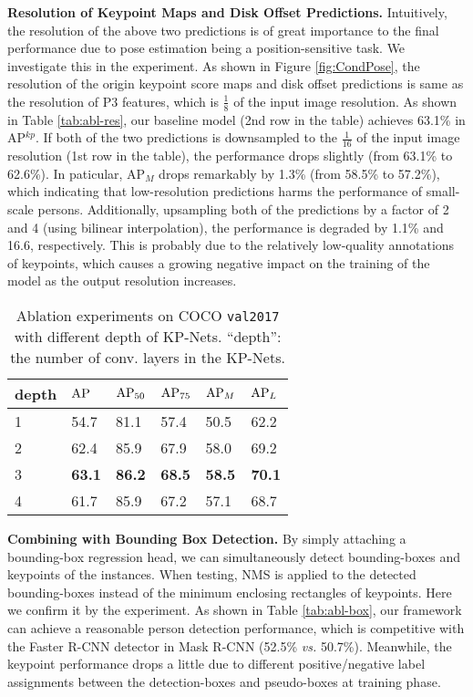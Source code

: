 \documentclass[sigconf]{acmart}
\begin{document}
\textbf{Resolution of Keypoint Maps and Disk Offset Predictions.}\quad
Intuitively, the resolution of the above two predictions is of great importance to the final performance due to pose estimation being a position-sensitive task.
We investigate this in the experiment.
As shown in Figure \ref{fig:CondPose}, the resolution of the origin keypoint score maps and disk offset predictions is same as the resolution of P3 features, which is $\frac{1}{8}$ of the input image resolution.
As shown in Table \ref{tab:abl-res}, our baseline model (2nd row in the table) achieves 63.1\% in AP$^{kp}$.
If both of the two predictions is downsampled to the $\frac{1}{16}$ of the input image resolution (1st row in the table), the performance drops slightly (from 63.1\% to 62.6\%). In paticular, AP$_{M}$ drops remarkably by 1.3\% (from 58.5\% to 57.2\%), which indicating that low-resolution predictions harms the performance of small-scale persons.
Additionally, upsampling both of the predictions by a factor of 2 and 4 (using bilinear interpolation), the performance is degraded by 1.1\% and 16.6, respectively. This is probably due to the relatively low-quality annotations of keypoints, which causes a growing negative impact on the training of the model as the output resolution increases.


\begin{table}
\renewcommand{\arraystretch}{1.2}
  \caption{Ablation experiments on COCO \texttt{val2017} with different depth of KP-Nets. ``depth'': the number of conv. layers in the KP-Nets.}
  \label{tab:abl-depth}
  \begin{tabular}{p{45 pt}<{\centering}p{25 pt}<{\centering}p{25 pt}<{\centering}p{25 pt}<{\centering}p{25 pt}<{\centering}p{25 pt}<{\centering}}
    \toprule
    depth & ${\rm AP}$ & ${\rm AP}_{50}$ & ${\rm AP}_{75}$ & ${\rm AP}_{M}$ & ${\rm AP}_{L}$ \\
    \midrule
    1 & 54.7 & 81.1 & 57.4 & 50.5 & 62.2 \\
    2 & 62.4 & 85.9 & 67.9 & 58.0 & 69.2 \\
    3 & \textbf{63.1} & \textbf{86.2} & \textbf{68.5} & \textbf{58.5} & \textbf{70.1} \\
    4 & 61.7 & 85.9 & 67.2 & 57.1 & 68.7 \\
  \bottomrule
\end{tabular}
\end{table}


\textbf{Combining with Bounding Box Detection.}\quad
By simply attaching a bounding-box regression head, we can simultaneously detect bounding-boxes and keypoints of the instances.
When testing, NMS is applied to the detected bounding-boxes instead of the minimum enclosing rectangles of keypoints. Here we confirm it by the experiment. As shown in Table \ref{tab:abl-box}, our framework can achieve a reasonable person detection performance, which is competitive with the Faster R-CNN detector in Mask R-CNN \cite{he2017mask} (52.5\% \textit{vs.} 50.7\%). Meanwhile, the keypoint performance drops a little due to different positive/negative label assignments between the detection-boxes and pseudo-boxes at training phase.
\end{document}
